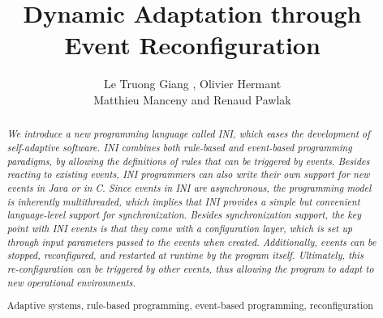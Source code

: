 \documentclass[runningheads,a4paper]{llncs}
\newcommand{\keywords}[1]{\par\addvspace\baselineskip
\noindent\keywordname\enspace\ignorespaces#1}
\begin{document}
\mainmatter  %

\title{Dynamic Adaptation through Event Reconfiguration}


%
%
\author{Le Truong Giang
, Olivier Hermant
\\ Matthieu Manceny and Renaud Pawlak}
%
\authorrunning{}


%
%

\maketitle


\begin{abstract}
\emph{
We introduce a new programming language called INI, which eases the development of self-adaptive software. INI combines both rule-based and event-based programming paradigms, by allowing the definitions of rules that can be triggered by events. Besides reacting to existing events, INI programmers can also write their own support for new events in Java or in C. Since events in INI are asynchronous, the programming model is inherently multithreaded, which implies that INI provides a simple but convenient language-level support for synchronization. Besides synchronization support, the key point with INI events is that they come with a configuration layer, which is set up through input parameters passed to the events when created. Additionally, events can be stopped, reconfigured, and restarted at runtime by the program itself. Ultimately, this re-configuration can be triggered by other events, thus allowing the program to adapt to new operational environments.
}
\keywords{Adaptive systems, rule-based programming, event-based programming, reconfiguration}
\end{abstract}
\end{document}
